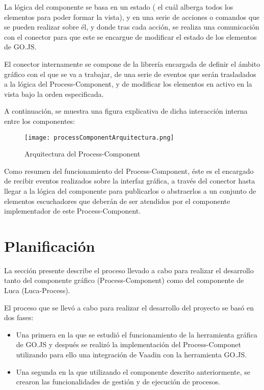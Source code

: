 La lógica del componente se basa en un estado ( el cuál alberga todos los elementos para poder formar la vista), y en una serie de acciones o comandos que se pueden realizar sobre él, y donde tras cada acción, se realiza una comunicación con el conector para que este se encargue de modificar el estado de los elementos de GO.JS.

El conector internamente se compone de la librería encargada de definir el ámbito gráfico con el que se va a trabajar, de una serie de eventos que serán trasladados a la lógica del Process-Component, y de modificar los elementos en activo en la vista bajo la orden especificada.

A continuación, se muestra una figura explicativa de dicha interacción interna entre los componentes:

\begin{figure}[!tb]
	\centering
	\texttt{[image: processComponentArquitectura.png]}
	\caption{Arquitectura del Process-Component}\label{fig:processComponent}
\end{figure}

Como resumen del funcionamiento del Process-Component, éste es el encargado de recibir eventos realizados sobre la interfaz gráfica, a través del conector hasta llegar a la lógica del componente para publicarlos o abstraerlos a un conjunto de elementos escuchadores que deberán de ser atendidos por el componente implementador de este Process-Component.


\section{Planificación}

La sección presente describe el proceso llevado a cabo para realizar el desarrollo tanto del componente gráfico (Process-Component) como del componente de Luca (Luca-Process).

El proceso que se llevó a cabo para realizar el desarrollo del proyecto se basó en dos fases:
	
\begin{itemize}
	\item  Una primera en la que se estudió el funcionamiento de la herramienta gráfica de GO.JS y después se realizó la implementación del Process-Componet utilizando para ello una integración de Vaadin con la herramienta GO.JS.
	\item  Una segunda en la que utilizando el componente descrito anteriormente, se crearon las funcionalidades de gestión y de ejecución de procesos.
\end{itemize}


